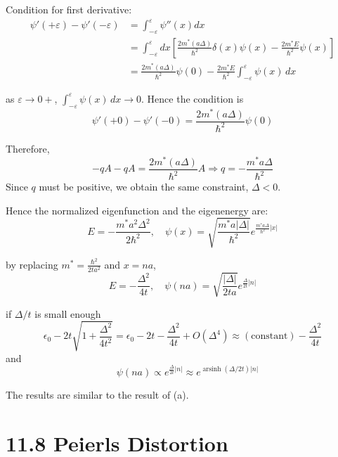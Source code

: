 \documentclass[a4paper,11pt]{article}
\begin{document}
Condition for first derivative:
\begin{align}
    \psi'(+\varepsilon)-\psi'(-\varepsilon) 
    &= \int_{-\varepsilon}^{\varepsilon} \psi''(x) dx \\
    &= \int_{-\varepsilon}^{\varepsilon} dx \left[\frac{2m^*(a\Delta)}{\hbar^2}\delta(x)\psi(x)-\frac{2m^*E}{\hbar^2}\psi(x)\right] \\
    &=\frac{2m^*(a\Delta)}{\hbar^2}\psi(0)-\frac{2m^* E}{\hbar^2}\int_{-\varepsilon}^{\varepsilon}\psi(x)\, dx
\end{align}

as $\varepsilon\rightarrow 0+$, $\int_{-\varepsilon}^{\varepsilon}\psi(x)\, dx\rightarrow 0$. Hence the condition is
\begin{equation}
    \psi'(+0)-\psi'(-0)=\frac{2m^*(a\Delta)}{\hbar^2}\psi(0)
\end{equation}

Therefore,
\begin{equation}
-qA-qA = \frac{2m^*(a\Delta)}{\hbar^2}A\Rightarrow q=-\frac{m^*a\Delta}{\hbar^2}
\end{equation}
Since $q$ must be positive, we obtain the same constraint, $\Delta <0$.

Hence the normalized eigenfunction and the eigenenergy are:
\begin{equation}
    E=-\frac{m^*a^2\Delta^2}{2\hbar^2}, \quad\psi(x)=\sqrt{\frac{m^*a|\Delta|}{\hbar^2}}e^{\frac{m^* a\Delta}{\hbar^2}|x|}
\end{equation}

by replacing $m^*=\frac{\hbar^2}{2t a^2}$ and $x=na$,
\begin{equation}
    E=-\frac{\Delta^2}{4t},\quad\psi(na)=\sqrt{\frac{|\Delta|}{2ta}}e^{\frac{\Delta}{2t}|n|}
\end{equation}


if $\Delta /t$ is small enough
\begin{equation}
    \epsilon_0-2t\sqrt{1+\frac{\Delta^2}{4t^2}}=\epsilon_0-2t -\frac{\Delta^2}{4t}+O(\Delta^4)\approx(\text{constant})-\frac{\Delta^2}{4t}
\end{equation}
and
\begin{equation}
    \quad\psi(na)\propto e^{\frac{\Delta}{2t}|n|}\approx e^{\operatorname{arsinh}(\Delta/2t)|n|}
\end{equation}

The results are similar to the result of (a).



\section{11.8 Peierls Distortion}
\end{document}
